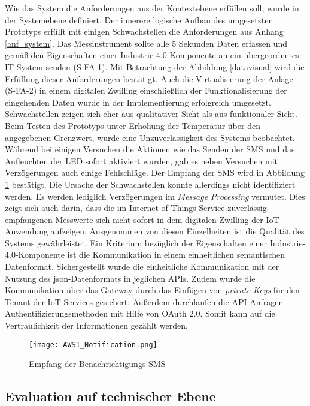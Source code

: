 Wie das System die Anforderungen aus der Kontextebene erfüllen soll, wurde in der Systemebene definiert. Der innerere logische Aufbau des umgesetzten Prototyps erfüllt mit einigen Schwachstellen die Anforderungen aus Anhang \ref{anf_system}.
Das Messinstrument sollte alle 5 Sekunden Daten erfassen und gemäß den Eigenschaften einer Industrie-4.0-Komponente an ein übergeordnetes IT-System senden (S-FA-1). Mit Betrachtung der Abbildung \ref{datavisual} wird die Erfüllung dieser Anforderungen bestätigt. Auch die Virtualisierung der Anlage (S-FA-2) in einem digitalen Zwilling einschließlich der Funktionalisierung der eingehenden Daten wurde in der Implementierung erfolgreich umgesetzt. 
Schwachstellen zeigen sich eher aus qualitativer Sicht als aus funktionaler Sicht. Beim Testen des Prototyps unter Erhöhung der Temperatur über den angegebenen Grenzwert, wurde eine Unzuverlässigkeit des Systems beobachtet. Während bei einigen Versuchen die Aktionen wie das Senden der SMS und das Aufleuchten der LED sofort aktiviert wurden, gab es neben Versuchen mit Verzögerungen auch einige Fehlschläge. Der Empfang der SMS wird in Abbildung \ref{awsnoti} bestätigt. Die Ursache der Schwachstellen konnte allerdings nicht identifiziert werden. Es werden lediglich Verzögerungen im \textit{Message Processing} vermutet. Dies zeigt sich auch darin, dass die im Internet of Things Service zuverlässig empfangenen Messwerte sich nicht sofort in dem digitalen Zwilling der IoT-Anwendung aufzeigen. Ausgenommen von diesen Einzelheiten ist die Qualität des Systems gewährleistet. Ein Kriterium bezüglich der Eigenschaften einer Industrie-4.0-Komponente ist die Kommunikation in einem einheitlichen semantischen Datenformat. Sichergestellt wurde die einheitliche Kommunikation mit der Nutzung des \ac{json}-Datenformats in jeglichen APIs. Zudem wurde die Kommunikation über das Gateway durch das Einfügen von \textit{private Keys} für den Tenant der IoT Services gesichert. Außerdem durchlaufen die API-Anfragen Authentifizierungsmethoden mit Hilfe von OAuth 2.0. Somit kann auf die Vertraulichkeit der Informationen gezählt werden. 

\begin{figure}[ht]
    \centering
    \texttt{[image: AWS1\_Notification.png]}
    \caption{Empfang der Benachrichtigungs-SMS}
    \label{awsnoti}
\end{figure}

\subsection{Evaluation auf technischer Ebene}


